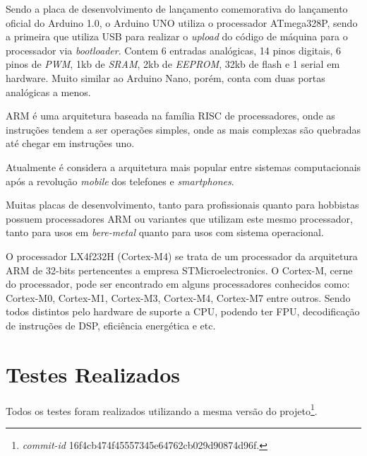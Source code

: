 Sendo a placa de desenvolvimento de lançamento comemorativa do lançamento oficial do Arduino 1.0, o Arduino UNO utiliza o processador ATmega328P, sendo a primeira que utiliza USB para realizar o \textit{upload} do código de máquina para o processador via \textit{bootloader}. Contem 6 entradas analógicas, 14 pinos digitais, 6 pinos de \textit{PWM}, 1kb de \textit{SRAM}, 2kb de \textit{EEPROM}, 32kb de flash e 1 serial em hardware. Muito similar ao Arduino Nano, porém, conta com duas portas analógicas a menos.


ARM é uma arquitetura baseada na família RISC de processadores, onde as instruções tendem a ser operações simples, onde as mais complexas são quebradas até chegar em instruções uno.

Atualmente é considera a arquitetura mais popular entre sistemas computacionais após a revolução \textit{mobile} dos telefones e \textit{smartphones}.

Muitas placas de desenvolvimento, tanto para profissionais quanto para hobbistas possuem processadores ARM ou variantes que utilizam este mesmo processador, tanto para usos em \textit{bere-metal} quanto para usos com sistema operacional.


O processador LX4f232H (Cortex-M4) se trata de um processador da arquitetura ARM de 32-bits pertencentes a empresa STMicroelectronics. O Cortex-M, cerne do processador, pode ser encontrado em alguns processadores conhecidos como: Cortex-M0, Cortex-M1, Cortex-M3, Cortex-M4, Cortex-M7 entre outros. Sendo todos distintos pelo hardware de suporte a CPU, podendo ter FPU, decodificação de instruções de DSP, eficiência energética e etc.


\section{Testes Realizados}

Todos os testes foram realizados utilizando a mesma versão do projeto\footnote{\textit{commit-id} 16f4cb474f45557345e64762cb029d90874d96f.}.

